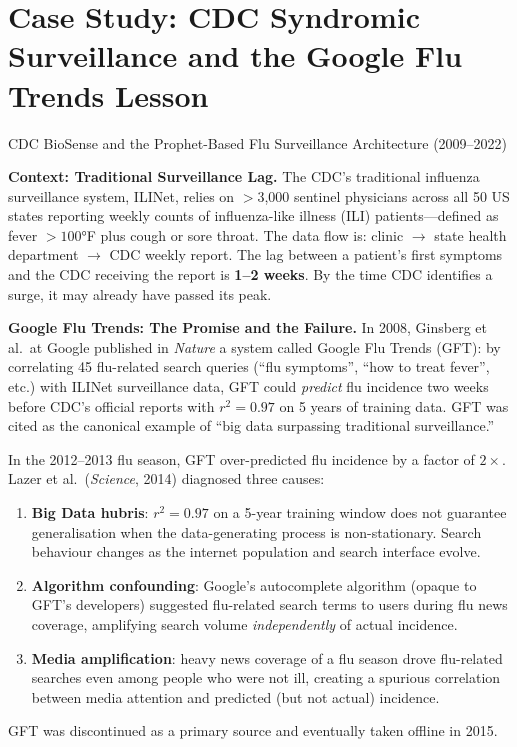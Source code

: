 \section{Case Study: CDC Syndromic Surveillance and the Google Flu
  Trends Lesson}
\label{sec:cdc-case}

\begin{casestudy}{CDC BioSense and the Prophet-Based Flu Surveillance
  Architecture (2009--2022)}

\textbf{Context: Traditional Surveillance Lag.}
The CDC's traditional influenza surveillance system, ILINet, relies on
$>$3{,}000 sentinel physicians across all 50 US states reporting weekly
counts of influenza-like illness (ILI) patients---defined as fever $> 100$°F
plus cough or sore throat. The data flow is: clinic $\to$ state health
department $\to$ CDC weekly report. The lag between a patient's first
symptoms and the CDC receiving the report is \textbf{1--2 weeks}.
By the time CDC identifies a surge, it may already have passed its peak.

\textbf{Google Flu Trends: The Promise and the Failure.}
In 2008, Ginsberg et al.\ at Google published in \textit{Nature} a
system called Google Flu Trends (GFT): by correlating 45 flu-related
search queries (``flu symptoms'', ``how to treat fever'', etc.) with
ILINet surveillance data, GFT could \emph{predict} flu incidence two weeks
before CDC's official reports with $r^2 = 0.97$ on 5 years of training data.
GFT was cited as the canonical example of ``big data surpassing traditional
surveillance.''

In the 2012--2013 flu season, GFT over-predicted flu incidence by a factor
of \textbf{$2\times$}. Lazer et al.\ (\textit{Science}, 2014)
\autocite{LazerFluTrends2014} diagnosed three causes:
\begin{enumerate}
  \item \textbf{Big Data hubris}: $r^2 = 0.97$ on a 5-year training
        window does not guarantee generalisation when the data-generating
        process is non-stationary. Search behaviour changes as the internet
        population and search interface evolve.
  \item \textbf{Algorithm confounding}: Google's autocomplete algorithm
        (opaque to GFT's developers) suggested flu-related search terms
        to users during flu news coverage, amplifying search volume
        \emph{independently} of actual incidence.
  \item \textbf{Media amplification}: heavy news coverage of a flu season
        drove flu-related searches even among people who were not ill,
        creating a spurious correlation between media attention and
        predicted (but not actual) incidence.
\end{enumerate}
GFT was discontinued as a primary source and eventually taken offline in 2015.


\end{casestudy}
